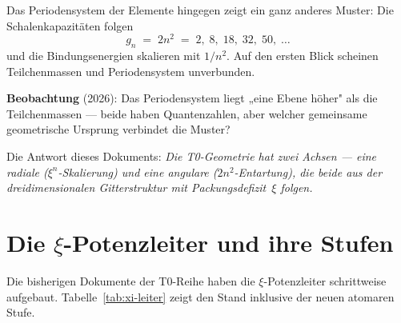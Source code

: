 Das Periodensystem der Elemente hingegen zeigt ein ganz anderes Muster:
Die Schalenkapazitäten folgen
\begin{equation}
  g_n \;=\; 2n^2 \;=\; 2,\; 8,\; 18,\; 32,\; 50,\;\ldots
  \label{eq:schalen}
\end{equation}
und die Bindungsenergien skalieren mit $1/n^2$.
Auf den ersten Blick scheinen Teilchenmassen und Periodensystem unverbunden.

\textbf{Beobachtung} (2026): Das Periodensystem liegt „eine Ebene
höher" als die Teilchenmassen — beide haben Quantenzahlen, aber welcher
gemeinsame geometrische Ursprung verbindet die Muster?

Die Antwort dieses Dokuments: \emph{Die T0-Geometrie hat zwei Achsen —
eine radiale ($\xi^n$-Skalierung) und eine angulare ($2n^2$-Entartung),
die beide aus der dreidimensionalen Gitterstruktur mit Packungsdefizit~$\xi$
folgen.}

\section{Die \texorpdfstring{$\xi$}{xi}-Potenzleiter und ihre Stufen}
\label{sec:xi-leiter}

Die bisherigen Dokumente der T0-Reihe haben die $\xi$-Potenzleiter
schrittweise aufgebaut. Tabelle~\ref{tab:xi-leiter} zeigt den Stand
inklusive der neuen atomaren Stufe.

\begin{table}[htbp]
\centering
\caption{Vollständige $\xi$-Potenzleiter (Stand: März 2026)}
\label{tab:xi-leiter}
\end{table}

